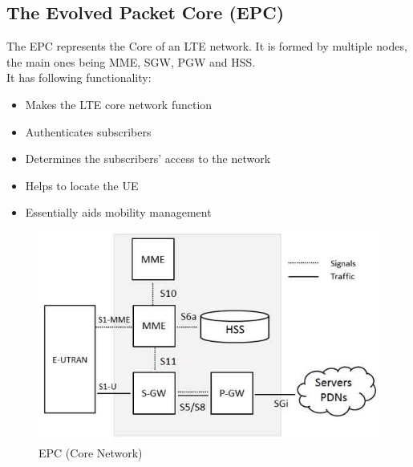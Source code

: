 \subsection{The Evolved Packet Core (EPC)}
{
    The EPC represents the Core of an LTE network. It is formed by multiple 
    nodes, the main ones being MME, SGW, PGW and HSS. \\
    It has following functionality:
    \begin{itemize}
        \item Makes the LTE core network function 
        \item Authenticates subscribers
        \item Determines the subscribers’ access to the network
        \item Helps to locate the UE
        \item Essentially aids mobility management
    \end{itemize}
    
    \begin{figure}[h]
        \centering
        \includegraphics[scale=0.5]{img/epc.jpg}
        \caption{EPC (Core Network)}
    \end{figure}
    
    }

